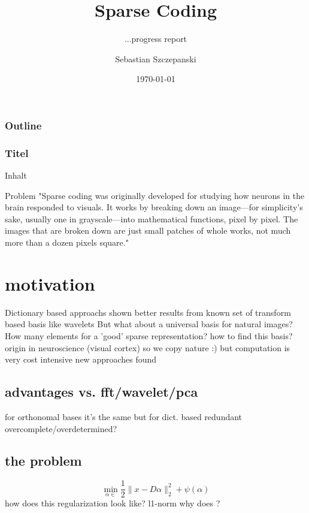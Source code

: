 




\title{Sparse Coding}
\subtitle{...progress report}
\author{Sebastian Szczepanski}
\date{\today}

\begin{frame}
\titlepage
\end{frame}

\begin{frame}
\frametitle{Outline}
\tableofcontents[part=1,pausesections]
\end{frame}

\begin{frame}
\frametitle{Titel}
Inhalt
\begin{block}{Problem}
"Sparse coding was originally developed for studying how neurons in the brain responded to visuals. It works by breaking down an image—for simplicity's sake, usually one in grayscale—into mathematical functions, pixel by pixel. The images that are broken down are just small patches of whole works, not much more than a dozen pixels square."
\end{block}

\end{frame}
\section{motivation}
Dictionary based approachs shown better results from known set of transform based basis like wavelets
But what about a universal basis for natural images? 
How many elements for a 'good' sparse representation?
how to find this basis?
origin in neuroscience (visual cortex) so we copy nature :)
but computation is very cost intensive
new approaches found 

\subsection{advantages vs. fft/wavelet/pca}
for orthonomal bases it's the same but for dict. based redundant overcomplete/overdetermined?

\subsection{the problem}
\begin{frame}
\[ 
\min_{\alpha\in} \frac{1}{2} \lVert x - D\alpha \rVert^{2}_{2} + \psi(\alpha)
\] 
how does this regularization look like?
l1-norm
why does ?
\end{frame}
